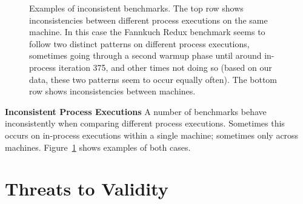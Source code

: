 \documentclass[a4paper,UKenglish]{lipics}
\begin{document}
\begin{figure}[t!]
\makebox[\textwidth][c]{~}  %
\caption{Examples of inconsistent benchmarks.
The top row shows inconsistencies between different process
executions on the same machine. In this case the Fannkuch Redux benchmark
seems to follow two distinct patterns on different process executions,
sometimes going through a second warmup phase until around in-process iteration 375, and
other times not doing so (based on our data, these two patterns seem to occur
equally often). The bottom row shows inconsistencies between
machines.}
\label{fig:examples:inconsistent}
\end{figure}

\textbf{Inconsistent Process Executions} \label{sub:inconsistent}
A number of benchmarks behave inconsistently when comparing different process executions. Sometimes this occurs on
in-process executions within a single machine; sometimes only across machines.
Figure~\ref{fig:examples:inconsistent} shows examples of both cases.


\section{Threats to Validity}
\label{sec:threats}
\end{document}
